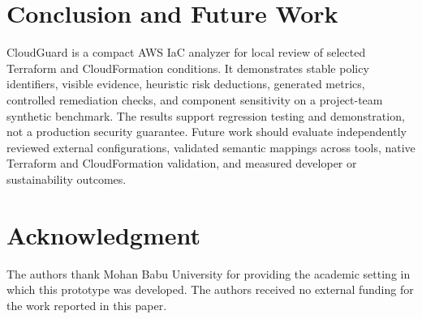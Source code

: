 \documentclass[conference]{IEEEtran}
\begin{document}
\section{Conclusion and Future Work}
CloudGuard is a compact AWS IaC analyzer for local review of selected Terraform and CloudFormation conditions. It demonstrates stable policy identifiers, visible evidence, heuristic risk deductions, generated metrics, controlled remediation checks, and component sensitivity on a project-team synthetic benchmark. The results support regression testing and demonstration, not a production security guarantee. Future work should evaluate independently reviewed external configurations, validated semantic mappings across tools, native Terraform and CloudFormation validation, and measured developer or sustainability outcomes.

\section*{Acknowledgment}
The authors thank Mohan Babu University for providing the academic setting in which this prototype was developed. The authors received no external funding for the work reported in this paper.
\end{document}
